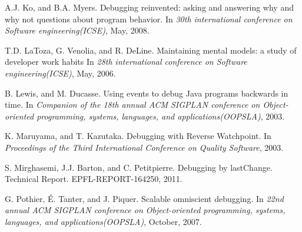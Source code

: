 \documentclass{sig-alternate}
\begin{document}
\begin{thebibliography}{16}

A.J. Ko, and B.A. Myers. \newblock Debugging reinvented: asking and answering why and why not questions about program behavior.
\newblock In \emph{30th international conference on Software engineering(ICSE)},
May, 2008.


T.D. LaToza, G. Venolia, and R. DeLine. \newblock Maintaining mental models: a study of developer work habits
\newblock In \emph{28th international conference on Software engineering(ICSE)},
May, 2006.

B. Lewis, and M. Ducasse. \newblock Using events to debug Java programs backwards in time.
\newblock In \emph{Companion of the 18th annual ACM SIGPLAN conference on Object-oriented programming, systems, languages, and applications(OOPSLA)},
2003.


K. Maruyama, and T. Kazutaka. \newblock Debugging with Reverse Watchpoint.
\newblock In \emph{Proceedings of the Third International Conference on Quality Software},
2003.

S. Mirghasemi, J.J. Barton, and C. Petitpierre. \newblock Debugging by lastChange.
\newblock Technical Report. EPFL-REPORT-164250, 2011. 

G. Pothier, \'{E}. Tanter, and J. Piquer. \newblock Scalable omniscient debugging.
\newblock In \emph{22nd annual ACM SIGPLAN conference on Object-oriented programming, systems, languages, and applications(OOPSLA)},
October, 2007.




\end{thebibliography}
\end{document}
